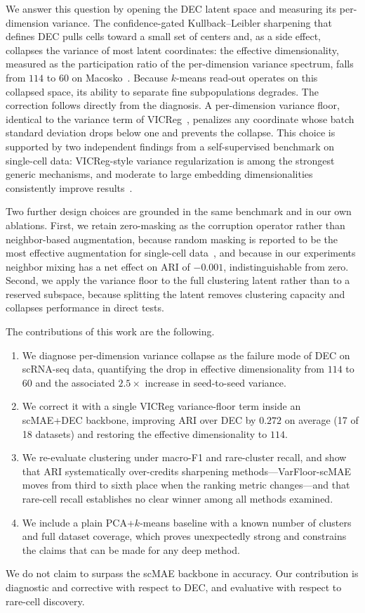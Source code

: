 We answer this question by opening the DEC latent space and measuring its per-dimension
variance. The confidence-gated Kullback--Leibler sharpening that defines DEC pulls cells
toward a small set of centers and, as a side effect, collapses the variance of most
latent coordinates: the effective dimensionality, measured as the participation ratio
of the per-dimension variance spectrum, falls from $114$ to $60$ on Macosko~\citep{macosko2015}.
Because $k$-means read-out operates on this collapsed space, its ability to separate fine
subpopulations degrades. The correction follows directly from the diagnosis. A
per-dimension variance floor, identical to the variance term of
VICReg~\citep{vicreg2022}, penalizes any coordinate whose batch standard deviation drops
below one and prevents the collapse. This choice is supported by two independent findings
from a self-supervised benchmark on single-cell data: VICReg-style variance regularization
is among the strongest generic mechanisms, and moderate to large embedding dimensionalities
consistently improve results~\citep{scsslbench2025}.

Two further design choices are grounded in the same benchmark and in our own ablations.
First, we retain zero-masking as the corruption operator rather than neighbor-based
augmentation, because random masking is reported to be the most effective augmentation
for single-cell data~\citep{scsslbench2025}, and because in our experiments neighbor
mixing has a net effect on ARI of $-0.001$, indistinguishable from zero. Second, we apply
the variance floor to the full clustering latent rather than to a reserved subspace,
because splitting the latent removes clustering capacity and collapses performance in
direct tests.

The contributions of this work are the following.
\begin{enumerate}
\item We diagnose per-dimension variance collapse as the failure mode of DEC on scRNA-seq
data, quantifying the drop in effective dimensionality from $114$ to $60$ and the
associated $2.5\times$ increase in seed-to-seed variance.
\item We correct it with a single VICReg variance-floor term inside an scMAE+DEC backbone,
improving ARI over DEC by $0.272$ on average (17 of 18 datasets) and restoring the
effective dimensionality to $114$.
\item We re-evaluate clustering under macro-F1 and rare-cluster recall, and show that ARI
systematically over-credits sharpening methods---VarFloor-scMAE moves from third to sixth
place when the ranking metric changes---and that rare-cell recall establishes no clear
winner among all methods examined.
\item We include a plain PCA+$k$-means baseline with a known number of clusters and full
dataset coverage, which proves unexpectedly strong and constrains the claims that can be
made for any deep method.
\end{enumerate}

We do not claim to surpass the scMAE backbone in accuracy. Our contribution is diagnostic
and corrective with respect to DEC, and evaluative with respect to rare-cell discovery.
